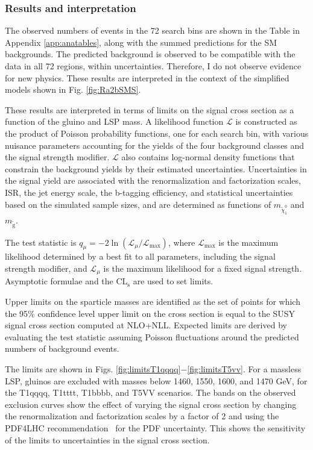 \FloatBarrier
\subsubsection{Results and interpretation}
The observed numbers of events in the 72 search bins
are shown in the Table in Appendix \ref{app:anatables}, along with the summed predictions for the SM backgrounds. The predicted background is observed to be compatible
with the data in all 72 regions, within uncertainties. Therefore, I do not observe evidence for new physics.
These results are interpreted in the context of the simplified models shown in Fig. \ref{fig:Ra2bSMS}.

These results are interpreted in terms of limits on the signal cross section
as a function of the gluino and LSP mass.
A likelihood function $\mathcal{L}$ is constructed as the product of Poisson probability functions,
one for each search bin, with various nuisance parameters accounting
for the yields of the four background classes and the signal strength modifier.
$\mathcal{L}$ also contains log-normal density functions that constrain the background 
yields by their estimated uncertainties. Uncertainties in the signal yield are associated
with the renormalization and factorization scales, ISR, the jet energy scale, the b-tagging efficiency,
and statistical uncertainties based on the simulated sample sizes, and are determined
as functions of $m_{\tilde{\chi}^{0}_{1}}$ and $m_{\tilde{\text{g}}}$.

The test statistic is
$q_\mu =  - 2 \ln \left( \mathcal{L}_\mu/\mathcal{L}_\text{max} \right)$,
where $\mathcal{L}_\text{max}$ is the maximum likelihood
determined by a best fit to all parameters, including the signal strength modifier,
and $\mathcal{L}_\mu$ is the maximum likelihood for a fixed signal strength.
Asymptotic formulae \cite{Cowan:2010js}
and the CL$_\mathrm{s}$ \cite{Junk1999,bib-cls} are used to set limits. 

Upper limits on the sparticle masses are identified as the set of points 
for which the 95\% confidence level upper limit on the cross section is equal to
the SUSY signal cross section computed at NLO+NLL. Expected limits are 
derived by evaluating the test statistic assuming Poisson fluctuations around
the predicted numbers of background events.

The limits are shown in Figs. \ref{fig:limitsT1qqqq}$-$\ref{fig:limitsT5vv}. For a massless LSP, gluinos are excluded with masses below 1460, 1550, 1600, and 1470 GeV,
for the T1qqqq, T1tttt, T1bbbb, and T5VV scenarios. The bands on the observed exclusion curves show the effect of varying the signal cross section by changing the renormalization and factorization scales by a factor of 2 and using the PDF4LHC recommendation~\cite{Botje:2011sn} for the PDF uncertainty. This shows the sensitivity of the limits to uncertainties in the signal cross section. 

